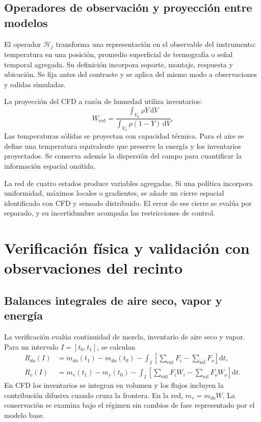 \subsection{Operadores de observación y proyección entre modelos}
\label{met:operadores}

El operador $\mathcal H_j$ transforma una representación en el observable del instrumento: temperatura en una posición, promedio superficial de termografía o señal temporal agregada. Su definición incorpora soporte, montaje, respuesta y ubicación. Se fija antes del contraste y se aplica del mismo modo a observaciones y salidas simuladas.

La proyección del CFD a razón de humedad utiliza inventarios:
\begin{equation}
W_{\mathrm{red}}=
\frac{\int_{V_a}\rho Y\,\mathrm dV}{\int_{V_a}\rho(1-Y)\,\mathrm dV}.
\label{met:proyeccion_W}
\end{equation}
Las temperaturas sólidas se proyectan con capacidad térmica. Para el aire se define una temperatura equivalente que preserve la energía y los inventarios proyectados. Se conserva además la dispersión del campo para cuantificar la información espacial omitida.

La red de cuatro estados produce variables agregadas. Si una política incorpora uniformidad, máximos locales o gradientes, se añade un cierre espacial identificado con CFD y sensado distribuido. El error de ese cierre se evalúa por separado, y su incertidumbre acompaña las restricciones de control.
\FloatBarrier

\section{Verificación física y validación con observaciones del recinto}
\label{met:validacion}

\subsection{Balances integrales de aire seco, vapor y energía}
\label{met:conservacion}

La verificación evalúa continuidad de mezcla, inventario de aire seco y vapor. Para un intervalo $I=[t_0,t_1]$, se calculan
\begin{align}
R_{da}(I)&=m_{da}(t_1)-m_{da}(t_0)
-\int_I\left[\sum_{\mathrm{ent}}F_i-\sum_{\mathrm{sal}}F_o\right]\mathrm dt,
\label{met:residual_aire_seco}\\
R_v(I)&=m_v(t_1)-m_v(t_0)
-\int_I\left[\sum_{\mathrm{ent}}F_iW_i-\sum_{\mathrm{sal}}F_oW_o\right]\mathrm dt.
\label{met:residual_vapor}
\end{align}
En CFD los inventarios se integran en volumen y los flujos incluyen la contribución difusiva cuando cruza la frontera. En la red, $m_v=m_{da}W$. La conservación se examina bajo el régimen sin cambios de fase representado por el modelo base.

